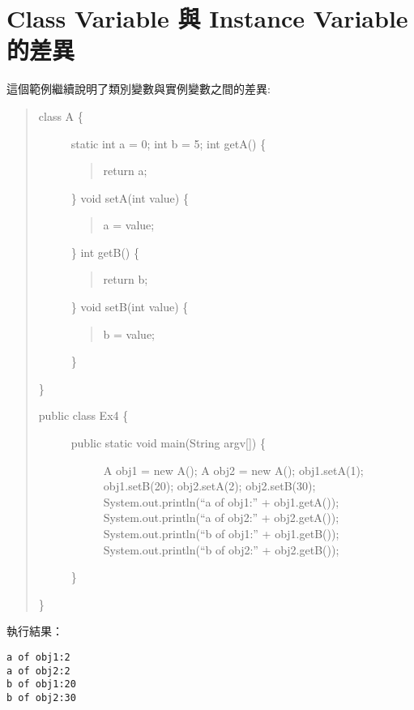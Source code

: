 \documentclass[a4paper,12pt,english]{sphinxmanual}
\begin{document}
\section{Class Variable 與 Instance Variable 的差異}
\label{java_object:class-variable-instance-variable}
這個範例繼續說明了類別變數與實例變數之間的差異:
\begin{quote}
\begin{description}
\item[{class A \{}] \leavevmode
static int a = 0;
int b = 5;
int getA() \{
\begin{quote}

return a;
\end{quote}

\}
void setA(int value) \{
\begin{quote}

a = value;
\end{quote}

\}
int getB() \{
\begin{quote}

return b;
\end{quote}

\}
void setB(int value) \{
\begin{quote}

b = value;
\end{quote}

\}

\end{description}

\}
\begin{description}
\item[{public class Ex4 \{}] \leavevmode\begin{description}
\item[{public static void main(String argv{[}{]}) \{}] \leavevmode
A obj1 = new A();
A obj2 = new A();
obj1.setA(1);
obj1.setB(20);
obj2.setA(2);
obj2.setB(30);
System.out.println(``a of obj1:'' + obj1.getA());
System.out.println(``a of obj2:'' + obj2.getA());
System.out.println(``b of obj1:'' + obj1.getB());
System.out.println(``b of obj2:'' + obj2.getB());

\end{description}

\}

\end{description}

\}
\end{quote}

執行結果：

\begin{Verbatim}[commandchars=@\[\]]
a of obj1:2
a of obj2:2
b of obj1:20
b of obj2:30
\end{Verbatim}
\end{document}
